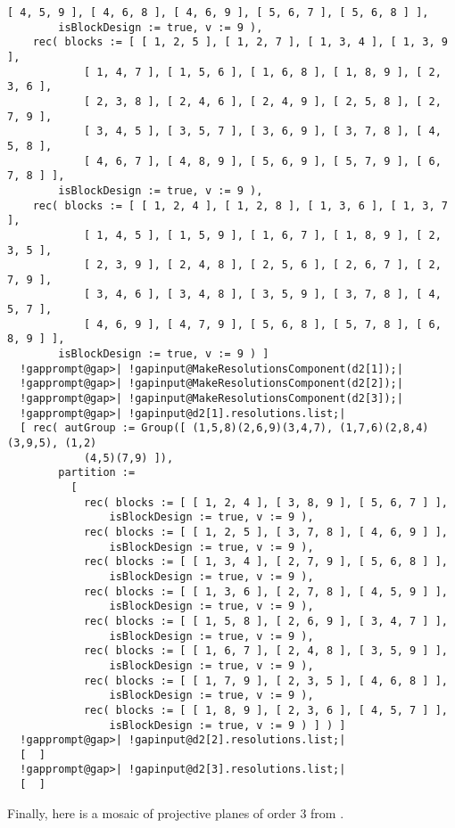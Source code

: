\documentclass[a4paper,11pt]{report}
\begin{document}
{{\begin{Verbatim}[commandchars=!@|,fontsize=\small,frame=single,label=Example]
            [ 4, 5, 9 ], [ 4, 6, 8 ], [ 4, 6, 9 ], [ 5, 6, 7 ], [ 5, 6, 8 ] ], 
        isBlockDesign := true, v := 9 ), 
    rec( blocks := [ [ 1, 2, 5 ], [ 1, 2, 7 ], [ 1, 3, 4 ], [ 1, 3, 9 ], 
            [ 1, 4, 7 ], [ 1, 5, 6 ], [ 1, 6, 8 ], [ 1, 8, 9 ], [ 2, 3, 6 ], 
            [ 2, 3, 8 ], [ 2, 4, 6 ], [ 2, 4, 9 ], [ 2, 5, 8 ], [ 2, 7, 9 ], 
            [ 3, 4, 5 ], [ 3, 5, 7 ], [ 3, 6, 9 ], [ 3, 7, 8 ], [ 4, 5, 8 ], 
            [ 4, 6, 7 ], [ 4, 8, 9 ], [ 5, 6, 9 ], [ 5, 7, 9 ], [ 6, 7, 8 ] ], 
        isBlockDesign := true, v := 9 ), 
    rec( blocks := [ [ 1, 2, 4 ], [ 1, 2, 8 ], [ 1, 3, 6 ], [ 1, 3, 7 ], 
            [ 1, 4, 5 ], [ 1, 5, 9 ], [ 1, 6, 7 ], [ 1, 8, 9 ], [ 2, 3, 5 ], 
            [ 2, 3, 9 ], [ 2, 4, 8 ], [ 2, 5, 6 ], [ 2, 6, 7 ], [ 2, 7, 9 ], 
            [ 3, 4, 6 ], [ 3, 4, 8 ], [ 3, 5, 9 ], [ 3, 7, 8 ], [ 4, 5, 7 ], 
            [ 4, 6, 9 ], [ 4, 7, 9 ], [ 5, 6, 8 ], [ 5, 7, 8 ], [ 6, 8, 9 ] ], 
        isBlockDesign := true, v := 9 ) ]
  !gapprompt@gap>| !gapinput@MakeResolutionsComponent(d2[1]);|
  !gapprompt@gap>| !gapinput@MakeResolutionsComponent(d2[2]);|
  !gapprompt@gap>| !gapinput@MakeResolutionsComponent(d2[3]);|
  !gapprompt@gap>| !gapinput@d2[1].resolutions.list;|
  [ rec( autGroup := Group([ (1,5,8)(2,6,9)(3,4,7), (1,7,6)(2,8,4)(3,9,5), (1,2)
            (4,5)(7,9) ]), 
        partition := 
          [ 
            rec( blocks := [ [ 1, 2, 4 ], [ 3, 8, 9 ], [ 5, 6, 7 ] ], 
                isBlockDesign := true, v := 9 ), 
            rec( blocks := [ [ 1, 2, 5 ], [ 3, 7, 8 ], [ 4, 6, 9 ] ], 
                isBlockDesign := true, v := 9 ), 
            rec( blocks := [ [ 1, 3, 4 ], [ 2, 7, 9 ], [ 5, 6, 8 ] ], 
                isBlockDesign := true, v := 9 ), 
            rec( blocks := [ [ 1, 3, 6 ], [ 2, 7, 8 ], [ 4, 5, 9 ] ], 
                isBlockDesign := true, v := 9 ), 
            rec( blocks := [ [ 1, 5, 8 ], [ 2, 6, 9 ], [ 3, 4, 7 ] ], 
                isBlockDesign := true, v := 9 ), 
            rec( blocks := [ [ 1, 6, 7 ], [ 2, 4, 8 ], [ 3, 5, 9 ] ], 
                isBlockDesign := true, v := 9 ), 
            rec( blocks := [ [ 1, 7, 9 ], [ 2, 3, 5 ], [ 4, 6, 8 ] ], 
                isBlockDesign := true, v := 9 ), 
            rec( blocks := [ [ 1, 8, 9 ], [ 2, 3, 6 ], [ 4, 5, 7 ] ], 
                isBlockDesign := true, v := 9 ) ] ) ]
  !gapprompt@gap>| !gapinput@d2[2].resolutions.list;|
  [  ]
  !gapprompt@gap>| !gapinput@d2[3].resolutions.list;|
  [  ]
\end{Verbatim}
 Finally, here is a mosaic of projective planes of order $3$ from \cite{VK24}. 
\begin{Verbatim}[commandchars=!@|,fontsize=\small,frame=single,label=Example]

\end{Verbatim}}}
\end{document}
